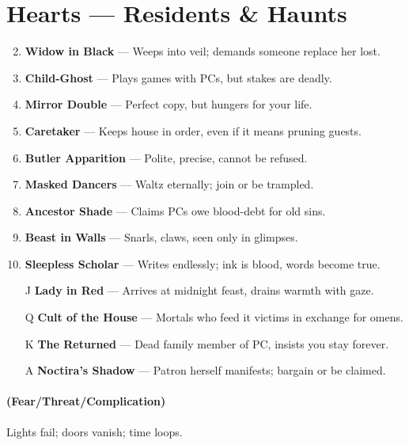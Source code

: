 \documentclass[11pt]{article}
\begin{document}
\section*{Hearts --- Residents \& Haunts}
\label{sec:haunted-house-residents}
\begin{enumerate}
\setcounter{enumi}{1}
\item \textbf{Widow in Black} --- Weeps into veil; demands someone replace her lost.
\item \textbf{Child-Ghost} --- Plays games with PCs, but stakes are deadly.
\item \textbf{Mirror Double} --- Perfect copy, but hungers for your life.
\item \textbf{Caretaker} --- Keeps house in order, even if it means pruning guests.
\item \textbf{Butler Apparition} --- Polite, precise, cannot be refused.
\item \textbf{Masked Dancers} --- Waltz eternally; join or be trampled.
\item \textbf{Ancestor Shade} --- Claims PCs owe blood-debt for old sins.
\item \textbf{Beast in Walls} --- Snarls, claws, seen only in glimpses.
\item \textbf{Sleepless Scholar} --- Writes endlessly; ink is blood, words become true.
\item[J] \textbf{Lady in Red} --- Arrives at midnight feast, drains warmth with gaze.
\item[Q] \textbf{Cult of the House} --- Mortals who feed it victims in exchange for omens.
\item[K] \textbf{The Returned} --- Dead family member of PC, insists you stay forever.
\item[A] \textbf{Noctira’s Shadow} --- Patron herself manifests; bargain or be claimed.
\end{enumerate}

\paragraph*{(Fear/Threat/Complication)} Lights fail; doors vanish; time loops.
\end{document}
